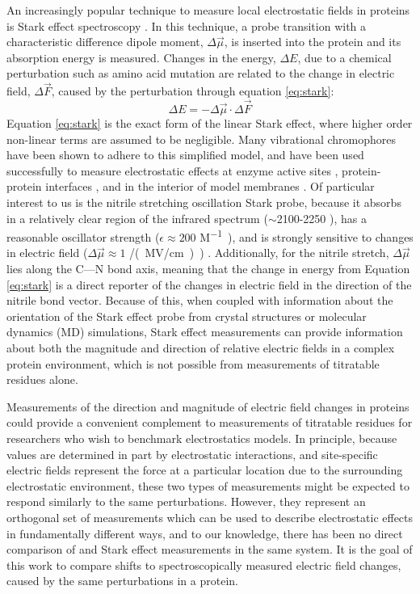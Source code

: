 An increasingly popular technique to measure local electrostatic fields in proteins is Stark effect spectroscopy \cite{Fafarman2010, Fried2014, Stafford2012}.
In this technique, a probe transition with a characteristic difference dipole moment, $\Delta \vec{\mu}$, is inserted into the protein and its absorption energy is measured. 
Changes in the energy, $\Delta E$, due to a chemical perturbation such as amino acid mutation are related to the change in electric field, $\Delta\vec{F}$, caused by the perturbation through equation \ref{eq:stark}: 
\begin{equation}
\Delta E = - \Delta\vec{\mu}\cdot\Delta\vec{F}
\label{eq:stark}
\end{equation}
Equation \ref{eq:stark} is the exact form of the linear Stark effect, where higher order non-linear terms are assumed to be negligible. 
Many vibrational chromophores have been shown to adhere to this simplified model, and have been used successfully to measure electrostatic effects at enzyme active sites \cite{Webb2008, Fafarman2012}, protein-protein interfaces \cite{Stafford2010, Walker2014}, and in the interior of model membranes \cite{Hu2011, Shrestha2015}.
Of particular interest to us is the nitrile stretching oscillation Stark probe, because it absorbs in a relatively clear region of the infrared spectrum ($\sim$2100-2250 \si{\wn}), has a reasonable oscillator strength ($\epsilon \approx 200$ \si{M\tothe{-1} \wn}), and is strongly sensitive to changes in electric field ($\Delta\vec{\mu} \approx 1$ \si{\wn/(MV/cm))} \cite{Webb2008}.
Additionally, for the nitrile stretch, $\Delta\vec{\mu}$ lies along the C---N bond axis, meaning that the change in energy from Equation \ref{eq:stark} is a direct reporter of the changes in electric field in the direction of the nitrile bond vector. 
Because of this, when coupled with information about the orientation of the Stark effect probe from crystal structures or molecular dynamics (MD) simulations, Stark effect measurements can provide information about both the magnitude and direction of relative electric fields in a complex protein environment, which is not possible from \pKa{} measurements of titratable residues alone. 

Measurements of the direction and magnitude of electric field changes in proteins could provide a convenient complement to \pKa{} measurements of titratable residues for researchers who wish to benchmark electrostatics models.  
In principle, because \pKa{} values are determined in part by electrostatic interactions, and site-specific electric fields represent the force at a particular location due to the surrounding electrostatic environment, these two types of measurements might be expected to respond similarly to the same perturbations. 
However, they represent an orthogonal set of measurements which can be used to describe electrostatic effects in fundamentally different ways, and to our knowledge, there has been no direct comparison of \pKa{} and Stark effect measurements in the same system. 
It is the goal of this work to compare \pKa{} shifts to spectroscopically measured electric field changes, caused by the same perturbations in a protein.

